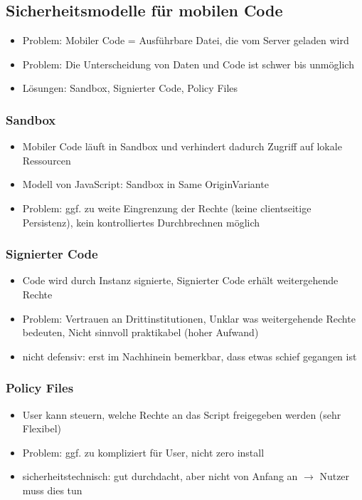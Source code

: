 \documentclass{article} %
\begin{document}
	\subsection{Sicherheitsmodelle für mobilen Code}
	\begin{itemize}
		\item Problem: Mobiler Code = Ausführbare Datei, die vom Server geladen wird
		\item Problem: Die Unterscheidung von Daten und Code ist schwer bis unmöglich
		\item Lösungen: Sandbox, Signierter Code, Policy Files
	\end{itemize}
	\subsubsection{Sandbox}
	\begin{itemize}
		\item Mobiler Code läuft in Sandbox und verhindert dadurch Zugriff auf lokale Ressourcen 
		\item Modell von JavaScript: Sandbox in \glqq Same Origin\grqq Variante
		\item Problem: ggf. zu weite Eingrenzung der Rechte (keine clientseitige Persistenz), kein kontrolliertes Durchbrechnen möglich
	\end{itemize}
	\subsubsection{Signierter Code}
	\begin{itemize}
		\item Code wird durch Instanz signierte, Signierter Code erhält weitergehende Rechte
		\item Problem: Vertrauen an Drittinstitutionen, Unklar was weitergehende Rechte bedeuten, Nicht sinnvoll praktikabel (hoher Aufwand)
		\item nicht defensiv: erst im Nachhinein bemerkbar, dass etwas schief gegangen ist
	\end{itemize}
	\subsubsection{Policy Files}
	\begin{itemize}
		\item User kann steuern, welche Rechte an das Script freigegeben werden (sehr Flexibel)
		\item Problem: ggf. zu kompliziert für User, nicht zero install
		\item sicherheitstechnisch: gut durchdacht, aber nicht von Anfang an $\rightarrow$ Nutzer muss dies tun
	\end{itemize}
	
\end{document}
